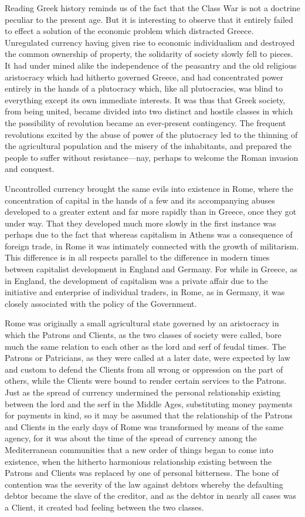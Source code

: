 \documentclass{book}
\begin{document}
Reading Greek history reminds us of the fact that the Class War is not a doctrine peculiar to the present age. But it is interesting to observe that it entirely failed to effect a solution of the economic problem which distracted Greece. Unregulated currency having given rise to economic individualism and destroyed the common ownership of property, the solidarity of society slowly fell to pieces. It had under mined alike the independence of the peasantry and the old religious aristocracy which had hitherto governed Greece, and had concentrated power entirely in the hands of a plutocracy which, like all plutocracies, was blind to everything except its own immediate interests. It was thus that Greek society, from being united, became divided into two distinct and hostile classes in which the possibility of revolution became an ever-present contingency. The frequent revolutions excited by the abuse of power of the plutocracy led to the thinning of the agricultural population and the misery of the inhabitants, and prepared the people to suffer without resistance—nay, perhaps to welcome the Roman invasion and conquest.

Uncontrolled currency brought the same evils into existence in Rome, where the concentration of capital in the hands of a few and its accompanying abuses developed to a greater extent and far more rapidly than in Greece, once they got under way. That they developed much more slowly in the first instance was perhaps due to the fact that whereas capitalism in Athens was a consequence of foreign trade, in Rome it was intimately connected with the growth of militarism. This difference is in all respects parallel to the difference in modern times between capitalist development in England and Germany. For while in Greece, as in England, the development of capitalism was a private affair due to the initiative and enterprise of individual traders, in Rome, as in Germany, it was closely associated with the policy of the Government.

Rome was originally a small agricultural state governed by an aristocracy in which the Patrons and Clients, as the two classes of society were called, bore much the same relation to each other as the lord and serf of feudal times. The Patrons or Patricians, as they were called at a later date, were expected by law and custom to defend the Clients from all wrong or oppression on the part of others, while the Clients were bound to render certain services to the Patrons. Just as the spread of currency undermined the personal relationship existing between the lord and the serf in the Middle Ages, substituting money payments for payments in kind, so it may be assumed that the relationship of the Patrons and Clients in the early days of Rome was transformed by means of the same agency, for it was about the time of the spread of currency among the Mediterranean communities that a new order of things began to come into existence, when the hitherto harmonious relationship existing between the Patrons and Clients was replaced by one of personal bitterness. The bone of contention was the severity of the law against debtors whereby the defaulting debtor became the slave of the creditor, and as the debtor in nearly all cases was a Client, it created bad feeling between the two classes.
\end{document}
